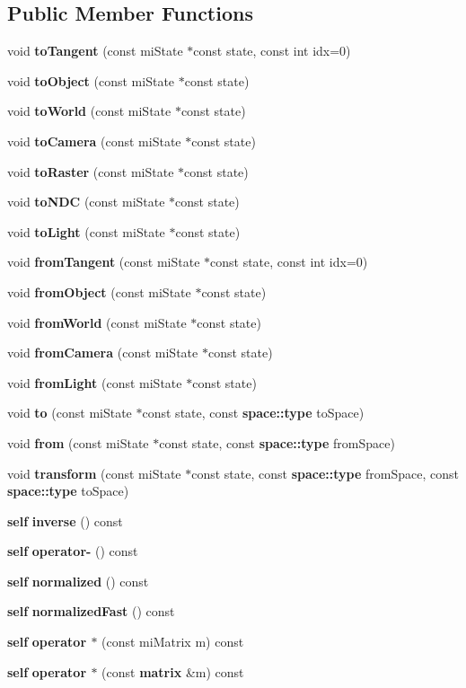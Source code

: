 \subsection*{Public Member Functions}
\begin{CompactItemize}
\item 
void {\bf to\-Tangent} (const mi\-State $\ast$const state, const int idx=0)
\item 
void {\bf to\-Object} (const mi\-State $\ast$const state)
\item 
void {\bf to\-World} (const mi\-State $\ast$const state)
\item 
void {\bf to\-Camera} (const mi\-State $\ast$const state)
\item 
void {\bf to\-Raster} (const mi\-State $\ast$const state)
\item 
void {\bf to\-NDC} (const mi\-State $\ast$const state)
\item 
void {\bf to\-Light} (const mi\-State $\ast$const state)
\item 
void {\bf from\-Tangent} (const mi\-State $\ast$const state, const int idx=0)
\item 
void {\bf from\-Object} (const mi\-State $\ast$const state)
\item 
void {\bf from\-World} (const mi\-State $\ast$const state)
\item 
void {\bf from\-Camera} (const mi\-State $\ast$const state)
\item 
void {\bf from\-Light} (const mi\-State $\ast$const state)
\item 
void {\bf to} (const mi\-State $\ast$const state, const {\bf space::type} to\-Space)
\item 
void {\bf from} (const mi\-State $\ast$const state, const {\bf space::type} from\-Space)
\item 
void {\bf transform} (const mi\-State $\ast$const state, const {\bf space::type} from\-Space, const {\bf space::type} to\-Space)
\item 
{\bf self} {\bf inverse} () const 
\item 
{\bf self} {\bf operator-} () const 
\item 
{\bf self} {\bf normalized} () const 
\item 
{\bf self} {\bf normalized\-Fast} () const 
\item 
{\bf self} {\bf operator $\ast$} (const mi\-Matrix m) const 
\item 
{\bf self} {\bf operator $\ast$} (const {\bf matrix} \&m) const 
\end{CompactItemize}
